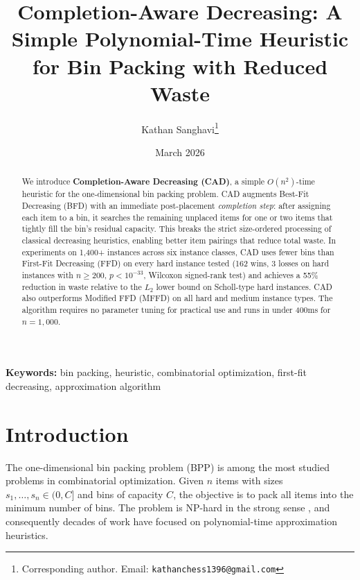 \documentclass[11pt]{article}
\title{Completion-Aware Decreasing: A Simple Polynomial-Time Heuristic\\for Bin Packing with Reduced Waste}
\author{
  Kathan Sanghavi\thanks{Corresponding author. Email: \texttt{kathanchess1396@gmail.com}}
}
\date{March 2026}
\begin{document}
\maketitle

\begin{abstract}
We introduce \textbf{Completion-Aware Decreasing (CAD)}, a simple $O(n^2)$-time heuristic
for the one-dimensional bin packing problem. CAD augments Best-Fit Decreasing (BFD)
with an immediate post-placement \emph{completion step}: after assigning each item to a bin,
it searches the remaining unplaced items for one or two items that tightly fill the bin's
residual capacity. This breaks the strict size-ordered processing of classical decreasing
heuristics, enabling better item pairings that reduce total waste. In experiments on
1{,}400+ instances across six instance classes, CAD uses fewer bins than First-Fit
Decreasing (FFD) on every hard instance tested (162 wins, 3 losses on hard instances
with $n \geq 200$, $p < 10^{-33}$, Wilcoxon signed-rank test) and achieves a 55\%
reduction in waste relative to the $L_2$ lower bound on Scholl-type hard instances.
CAD also outperforms Modified FFD (MFFD) on all hard and medium instance types.
The algorithm requires no parameter tuning for practical use and runs in under 400ms
for $n = 1{,}000$.
\end{abstract}

\noindent\textbf{Keywords:} bin packing, heuristic, combinatorial optimization, first-fit decreasing, approximation algorithm

\section{Introduction}

The one-dimensional bin packing problem (BPP) is among the most studied problems in
combinatorial optimization. Given $n$ items with sizes $s_1, \ldots, s_n \in (0, C]$
and bins of capacity $C$, the objective is to pack all items into the minimum number
of bins. The problem is NP-hard in the strong sense \citep{garey1979computers}, and
consequently decades of work have focused on polynomial-time approximation heuristics.
\end{document}
